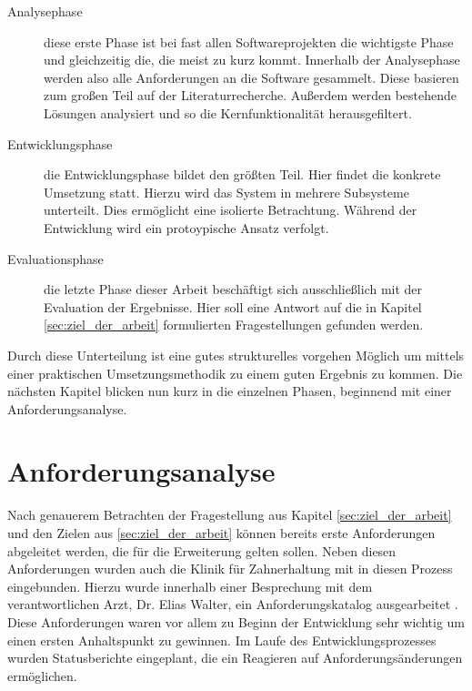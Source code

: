 \begin{description}
	\item[Analysephase] diese erste Phase ist bei fast allen Softwareprojekten die
		wichtigste Phase und gleichzeitig die, die meist zu kurz kommt. Innerhalb der
		Analysephase werden also alle Anforderungen an die Software gesammelt. Diese
		basieren zum großen Teil auf der Literaturrecherche. Außerdem werden bestehende
		Lösungen analysiert und so die Kernfunktionalität herausgefiltert.

	\item[Entwicklungsphase] die Entwicklungsphase bildet den größten Teil. Hier
		findet die konkrete Umsetzung statt. Hierzu wird das System in mehrere Subsysteme
		unterteilt. Dies ermöglicht eine isolierte Betrachtung. Während der Entwicklung
		wird ein protoypische Ansatz verfolgt.

	\item[Evaluationsphase] die letzte Phase dieser Arbeit beschäftigt sich ausschließlich
		mit der Evaluation der Ergebnisse. Hier soll eine Antwort auf die in Kapitel
		\ref{sec:ziel_der_arbeit} formulierten Fragestellungen gefunden werden.
\end{description}

Durch diese Unterteilung ist eine gutes strukturelles vorgehen Möglich um
mittels einer praktischen Umsetzungsmethodik zu einem guten Ergebnis zu kommen. Die
nächsten Kapitel blicken nun kurz in die einzelnen Phasen, beginnend mit einer
Anforderungsanalyse.

\section{Anforderungsanalyse}
\label{sec:anforderungsanalyse} Nach genauerem Betrachten der Fragestellung aus
Kapitel \ref{sec:ziel_der_arbeit} und den Zielen aus \ref{sec:ziel_der_arbeit}
können bereits erste Anforderungen abgeleitet werden, die für die Erweiterung gelten
sollen. Neben diesen Anforderungen wurden auch die Klinik für Zahnerhaltung mit
in diesen Prozess eingebunden. Hierzu wurde innerhalb einer Besprechung mit dem verantwortlichen
Arzt, Dr. Elias Walter, ein Anforderungskatalog ausgearbeitet \citep[vgl.][]{walter2025}.
Diese Anforderungen waren vor allem zu Beginn der Entwicklung sehr wichtig um
einen ersten Anhaltspunkt zu gewinnen. Im Laufe des Entwicklungsprozesses wurden
Statusberichte eingeplant, die ein Reagieren auf Anforderungsänderungen
ermöglichen.

